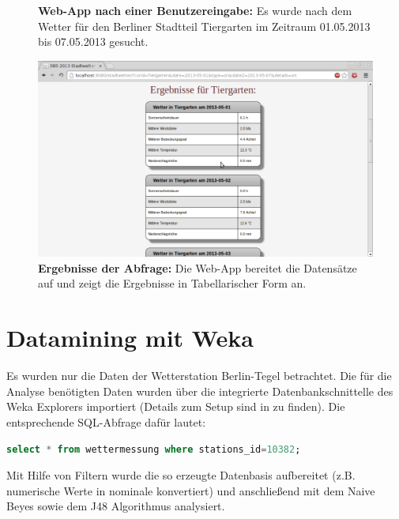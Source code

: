 \documentclass[11pt,a4paper,DIV=10,]{scrartcl}
\begin{document}
\begin{center}
\begin{figure}[H]
\caption{\textbf{Web-App nach einer Benutzereingabe:} Es wurde nach dem Wetter für den Berliner Stadtteil Tiergarten im Zeitraum 01.05.2013 bis 07.05.2013 gesucht.}
\end{figure}
\begin{figure}[H]
\includegraphics[scale=0.4]{Web-App_3}
\caption{\textbf{Ergebnisse der Abfrage:} Die Web-App bereitet die Datensätze auf und zeigt die Ergebnisse in Tabellarischer Form an.}
\end{figure}
\end{center}

\section{Datamining mit Weka}
Es wurden nur die Daten der Wetterstation Berlin-Tegel betrachtet. Die für die Analyse benötigten Daten wurden über die integrierte Datenbankschnittelle des Weka Explorers importiert (Details zum Setup sind in \cite{weka.data} zu finden). Die entsprechende SQL-Abfrage dafür lautet:
\begin{lstlisting}[language=sql]
select * from wettermessung where stations_id=10382;
\end{lstlisting}
Mit Hilfe von Filtern wurde die so erzeugte Datenbasis aufbereitet (z.B. numerische Werte in nominale konvertiert) und anschließend mit dem Naive Beyes sowie dem J48 Algorithmus analysiert.


\end{document}
